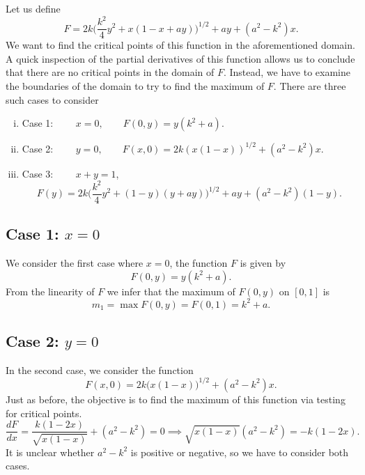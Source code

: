 \documentclass[11pt,reqno]{amsart}
\theoremstyle{definition}
\numberwithin{equation}{section} \setcounter{tocdepth}{1}
\numberwithin{equation}{section}
\begin{document}
Let us define \begin{equation}
 F= 2k\bigg(\frac{k^2}{4}y^2+x(1-x+ay)\bigg)^{1/2}+ay+(a^2-k^2)x.
\end{equation} We want to find the critical points of this function in the aforementioned domain. A quick inspection of the partial derivatives of this function allows us to conclude that there are no critical points in the domain of $F$. Instead, we have to examine the boundaries of the domain to try to find the maximum of $F$. There are three such cases to consider
\begin{enumerate}[(i)]
    \item Case 1: $\qquad x=0, \qquad F(0,y)=y(k^2+a)$.
    \item Case 2: $\qquad y=0, \qquad F(x,0)=2k(x(1-x))^{1/2}+(a^2-k^2)x.$
    \item Case 3: $\qquad x+y=1$,
    $$F(y)=2k\bigg(\frac{k^2}{4}y^2+(1-y)(y+ay)\bigg)^{1/2}+ay+(a^2-k^2)(1-y).$$
\end{enumerate}

\subsection{Case 1: $x=0$}

We consider the first case where $x=0$, the function $F$ is given by
\begin{equation}
    F(0,y)=y(k^2+a).
\end{equation}
From the linearity of $F$ we infer that the maximum of $F(0,y)$ on $[0,1]$ is
\begin{equation}
    m_1=\max F(0,y)=F(0,1)=k^2+a.
\end{equation}

\subsection{Case 2: $y=0$}
In the second case, we consider the function
\begin{equation}
    F(x,0)=2k\bigg(x(1-x)\bigg)^{1/2}+(a^2-k^2)x.
\end{equation} Just as before, the objective is to find the maximum of this function via testing for critical points.
\begin{equation}
    \frac{dF}{dx}=\frac{k(1-2x)}{\sqrt{x(1-x)}}+(a^2-k^2)=0 \implies \sqrt{x(1-x)}(a^2-k^2)=-k(1-2x).
\end{equation}It is unclear whether $a^2-k^2$ is positive or negative, so we have to consider both cases.\\
\end{document}
